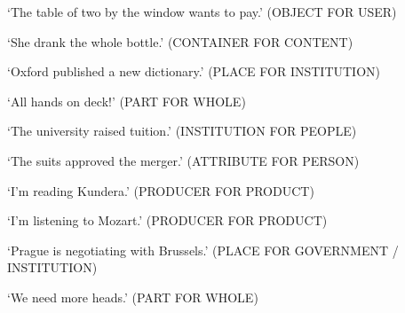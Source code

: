 \documentclass[a4paper]{article}
\begin{document}
\begin{exe}
  \ex {}
      \trans `The table of two by the window wants to pay.'
      \hfill (OBJECT FOR USER)

  \ex {}
      \trans `She drank the whole bottle.'
      \hfill (CONTAINER FOR CONTENT)

  \ex {}
      \trans `Oxford published a new dictionary.'
      \hfill (PLACE FOR INSTITUTION)

  \ex {}
      \trans `All hands on deck!'
      \hfill (PART FOR WHOLE)

  \ex {}
      \trans `The university raised tuition.'
      \hfill (INSTITUTION FOR PEOPLE)

  \ex {}
      \trans `The suits approved the merger.'
      \hfill (ATTRIBUTE FOR PERSON)
\end{exe}
\begin{exe}
  \ex {}
      \trans `I'm reading Kundera.'
      \hfill (PRODUCER FOR PRODUCT)

  \ex {}
      \trans `I'm listening to Mozart.'
      \hfill (PRODUCER FOR PRODUCT)

  \ex {}
      \trans `Prague is negotiating with Brussels.'
      \hfill (PLACE FOR GOVERNMENT / INSTITUTION)

  \ex {}
      \trans `We need more heads.'
      \hfill (PART FOR WHOLE)
\end{exe}
\end{document}
